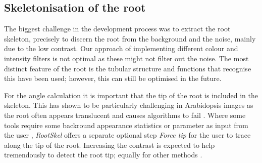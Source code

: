 \subsection{Skeletonisation of the root}

The biggest challenge in the development process was to extract the root skeleton, precisely to discern the root from the background and the noise, mainly due to the low contrast. %
Our approach of implementing different colour and intensity filters is not optimal as these might not filter out the noise. 
The most distinct feature of the root is the tubular structure and functions that recognise this have been used; however, this can still be optimised in the future. 


For the angle calculation it is important that the tip of the root is included in the skeleton. This has shown to be particularly challenging in Arabidopsis images as the root often appears translucent \cite{french2009high} and causes algorithms to fail \cite{french2009high}. Where some tools require some backround appearance statistics or parameter as input from the user \cite{french2009high}, \textit{RootSkel} offers a separate optional step \textit{Force tip} for the user to trace along the tip of the root. Increasing the contrast is expected to help tremendously to detect the root tip; equally for other methods \cite{french2009high}.


